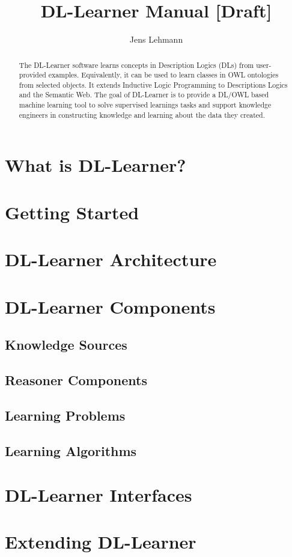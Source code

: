 \documentclass[a4paper,12pt]{scrartcl}
\title{DL-Learner Manual [Draft]}
\author{Jens Lehmann}
\begin{document}
\maketitle

\begin{abstract}
The DL-Learner software learns concepts in Description Logics (DLs) from user-provided examples. Equivalently, it can be used to learn classes in OWL ontologies from selected objects. It extends Inductive Logic Programming to Descriptions Logics and the Semantic Web. The goal of DL-Learner is to provide a DL/OWL based machine learning tool to solve supervised learnings tasks and support knowledge engineers in constructing knowledge and learning about the data they created.
\end{abstract}

\tableofcontents

\section{What is DL-Learner?}

\section{Getting Started}

\section{DL-Learner Architecture}

\section{DL-Learner Components}

\subsection{Knowledge Sources}

\subsection{Reasoner Components}

\subsection{Learning Problems}

\subsection{Learning Algorithms}

\section{DL-Learner Interfaces}

\section{Extending DL-Learner}
\end{document}

